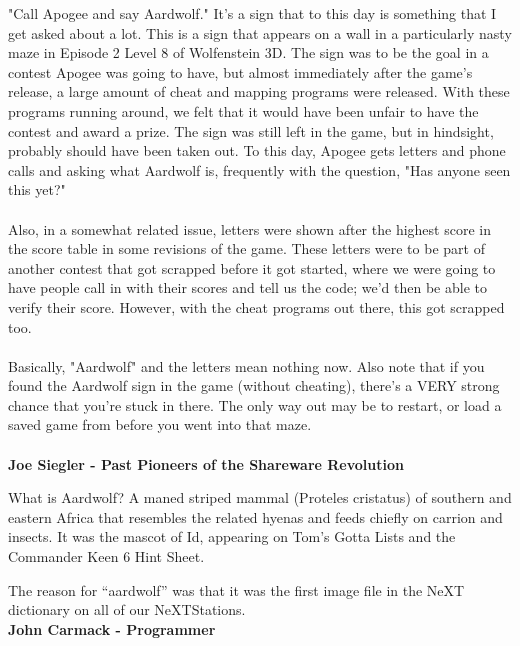 \par
\begin{fancyquotes}
"Call Apogee and say Aardwolf."  It's a sign that to this day is something
that I get asked about a lot.  This is a sign that appears on a wall in a
particularly nasty maze in Episode 2 Level 8 of Wolfenstein 3D.  The sign
was to be the goal in a contest Apogee was going to have, but almost
immediately after the game's release, a large amount of cheat and mapping
programs were released.  With these programs running around, we felt that
it would have been unfair to have the contest and award a prize.  The sign
was still left in the game, but in hindsight, probably should have been
taken out.  To this day, Apogee gets letters and phone calls and asking
what Aardwolf is, frequently with the question, "Has anyone seen this yet?"\\
\\
Also, in a somewhat related issue, letters were shown after the highest score
in the score table in some revisions of the game.  These letters were to be
part of another contest that got scrapped before it got started, where we were
going to have people call in with their scores and tell us the code; we'd then
be able to verify their score.  However, with the cheat programs out there,
this got scrapped too.\\
\\
Basically, "Aardwolf" and the letters mean nothing now.  Also note that if
you found the Aardwolf sign in the game (without cheating), there's a VERY
strong chance that you're stuck in there.  The only way out may be to restart,
or load a saved game from before you went into that maze.\\
\\
\textbf{Joe Siegler - Past Pioneers of the Shareware Revolution}
\end{fancyquotes}
\par
{} What is Aardwolf? A maned striped mammal (Proteles cristatus) of southern and eastern Africa that resembles the related hyenas and feeds chiefly on carrion and insects. It was the mascot of Id, appearing on Tom's Gotta Lists and the Commander Keen 6 Hint Sheet.\\
\par

 \begin{fancyquotes}
The reason for “aardwolf” was that it was the first image file in the NeXT dictionary on all of our NeXTStations.
\bigskip \\
\textbf{John Carmack - Programmer}
 \end{fancyquotes}













